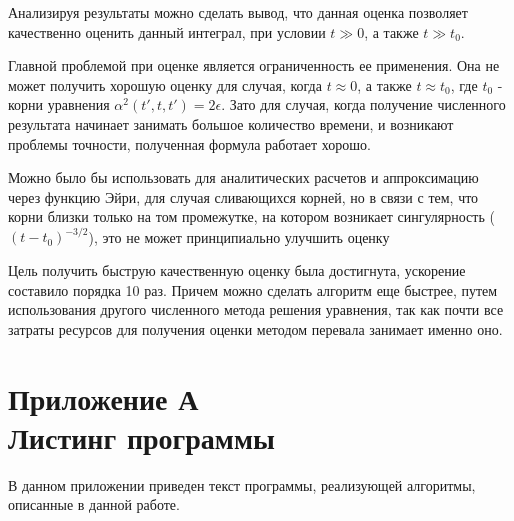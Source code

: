 \documentclass[14pt, a4paper]{article}
\numberwithin{figure}{section}
\numberwithin{equation}{section}
\begin{document}
Анализируя результаты можно сделать вывод, что данная оценка позволяет качественно оценить данный интеграл, при условии $t \gg 0$, а также $t \gg t_0$.

Главной проблемой при оценке является ограниченность ее применения. Она не может получить хорошую оценку для случая, когда $t \approx 0$, а также $t \approx t_0$, где $t_0$ - корни уравнения $\alpha^2(t', t, t') = 2\epsilon$. Зато для случая, когда получение численного результата начинает занимать большое количество времени, и возникают проблемы точности, полученная формула работает хорошо. 

Можно было бы использовать для аналитических расчетов и аппроксимацию через функцию Эйри, для случая сливающихся корней, но в связи с тем, что корни близки только на том промежутке, на котором возникает сингулярность ($(t-t_0)^{-3/2}$), это не может принципиально улучшить оценку

Цель получить быструю качественную оценку была достигнута, ускорение составило порядка 10 раз. Причем можно сделать алгоритм еще быстрее, путем использования другого численного метода решения уравнения, так как почти все затраты ресурсов для получения оценки методом перевала занимает именно оно.


\newpage
{}



\newpage
{}
\section*{Приложение А\\Листинг программы}\label{attachA}

В данном приложении приведен текст программы, реализующей алгоритмы, описанные в данной работе.


\end{document}
